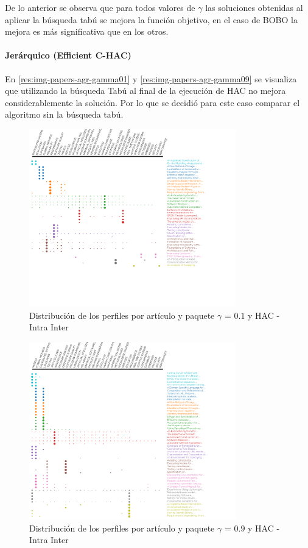 De lo anterior se observa que para todos valores de $\gamma$ las soluciones obtenidas al aplicar la búsqueda tabú se mejora la función objetivo, en el caso de BOBO la mejora es más significativa que en los otros.\\

\paragraph{Jerárquico (Efficient C-HAC)}
En \ref{res:img-papers-agr-gamma01} y \ref{res:img-papers-agr-gamma09} se visualiza que utilizando la búsqueda Tabú al final de la ejecución de HAC no mejora considerablemente la solución. Por lo que se decidió para este caso comparar el algoritmo sin la búsqueda tabú.
\begin{figure}[H]
  \centering
    \includegraphics[width=0.8\textwidth]{resultados/papers/HAC/INTRA_INTER/gamma-01.png}
  \caption{Distribución de los perfiles por artículo y paquete $\gamma$ = $0.1$ y HAC - Intra Inter}
  \label{res:img-papers-gamma01-hac-intra-inter}
\end{figure}

\begin{figure}[H]
  \centering
    \includegraphics[width=0.8\textwidth]{resultados/papers/HAC/INTRA_INTER/gamma-09.png}
  \caption{Distribución de los perfiles por artículo y paquete $\gamma$ = $0.9$ y HAC - Intra Inter}
  \label{res:img-papers-gamma09-hac-intra-inter}
\end{figure}

